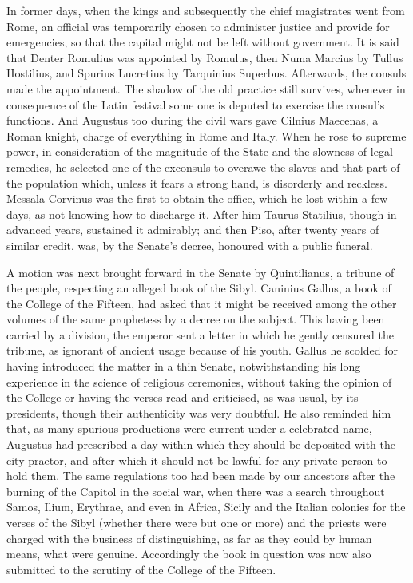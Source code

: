 
In former days, when the kings and subsequently the chief magistrates went from Rome, an official was temporarily chosen to administer justice and provide for emergencies, so that the capital might not be left without government. It is said that Denter Romulius was appointed by Romulus, then Numa Marcius by Tullus Hostilius, and Spurius Lucretius by Tarquinius Superbus. Afterwards, the consuls made the appointment. The shadow of the old practice still survives, whenever in consequence of the Latin festival some one is deputed to exercise the consul's functions. And Augustus too during the civil wars gave Cilnius Maecenas, a Roman knight, charge of everything in Rome and Italy. When he rose to supreme power, in consideration of the magnitude of the State and the slowness of legal remedies, he selected one of the exconsuls to overawe the slaves and that part of the population which, unless it fears a strong hand, is disorderly and reckless. Messala Corvinus was the first to obtain the office, which he lost within a few days, as not knowing how to discharge it. After him Taurus Statilius, though in advanced years, sustained it admirably; and then Piso, after twenty years of similar credit, was, by the Senate's decree, honoured with a public funeral.


A motion was next brought forward in the Senate by Quintilianus, a tribune of the people, respecting an alleged book of the Sibyl. Caninius Gallus, a book of the College of the Fifteen, had asked that it might be received among the other volumes of the same prophetess by a decree on the subject. This having been carried by a division, the emperor sent a letter in which he gently censured the tribune, as ignorant of ancient usage because of his youth. Gallus he scolded for having introduced the matter in a thin Senate, notwithstanding his long experience in the science of religious ceremonies, without taking the opinion of the College or having the verses read and criticised, as was usual, by its presidents, though their authenticity was very doubtful. He also reminded him that, as many spurious productions were current under a celebrated name, Augustus had prescribed a day within which they should be deposited with the city-praetor, and after which it should not be lawful for any private person to hold them. The same regulations too had been made by our ancestors after the burning of the Capitol in the social war, when there was a search throughout Samos, Ilium, Erythrae, and even in Africa, Sicily and the Italian colonies for the verses of the Sibyl (whether there were but one or more) and the priests were charged with the business of distinguishing, as far as they could by human means, what were genuine. Accordingly the book in question was now also submitted to the scrutiny of the College of the Fifteen.

